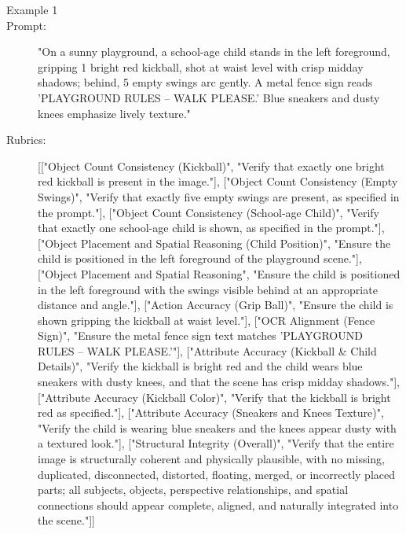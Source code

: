 \documentclass{llmxive}
\begin{document}
\begin{tcolorbox}[
  breakable,
  enhanced,
  colback=white,
  colframe=black!70,
  boxrule=0.8pt,
  arc=2pt,
  title={Prompt-rubric Examples},
  colbacktitle=black!75,
  coltitle=white,
  fonttitle=\bfseries,
  left=8pt,right=8pt,top=8pt,bottom=8pt
]
\footnotesize
\begin{description}
\item[Example 1]
\item[Prompt:] "On a sunny playground, a school-age child stands in the left foreground, gripping 1 bright red kickball, shot at waist level with crisp midday shadows; behind, 5 empty swings arc gently. A metal fence sign reads 'PLAYGROUND RULES – WALK PLEASE.' Blue sneakers and dusty knees emphasize lively texture."
\item[Rubrics:] [["Object Count Consistency (Kickball)", "Verify that exactly one bright red kickball is present in the image."], ["Object Count Consistency (Empty Swings)", "Verify that exactly five empty swings are present, as specified in the prompt."], ["Object Count Consistency (School-age Child)", "Verify that exactly one school-age child is shown, as specified in the prompt."], ["Object Placement and Spatial Reasoning (Child Position)", "Ensure the child is positioned in the left foreground of the playground scene."], ["Object Placement and Spatial Reasoning", "Ensure the child is positioned in the left foreground with the swings visible behind at an appropriate distance and angle."], ["Action Accuracy (Grip Ball)", "Ensure the child is shown gripping the kickball at waist level."], ["OCR Alignment (Fence Sign)", "Ensure the metal fence sign text matches 'PLAYGROUND RULES – WALK PLEASE.'"], ["Attribute Accuracy (Kickball \& Child Details)", "Verify the kickball is bright red and the child wears blue sneakers with dusty knees, and that the scene has crisp midday shadows."], ["Attribute Accuracy (Kickball Color)", "Verify that the kickball is bright red as specified."], ["Attribute Accuracy (Sneakers and Knees Texture)", "Verify the child is wearing blue sneakers and the knees appear dusty with a textured look."], ["Structural Integrity (Overall)", "Verify that the entire image is structurally coherent and physically plausible, with no missing, duplicated, disconnected, distorted, floating, merged, or incorrectly placed parts; all subjects, objects, perspective relationships, and spatial connections should appear complete, aligned, and naturally integrated into the scene."]]


\end{description}
\end{tcolorbox}
\end{document}
